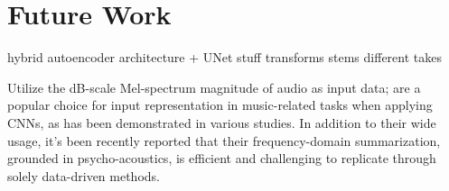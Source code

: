 \chapter{Future Work}

hybrid autoencoder architecture + UNet stuff
transforms
stems
different takes

Utilize the dB-scale Mel-spectrum magnitude of audio as input data; are a popular choice for input representation in music-related tasks when applying CNNs, as has been demonstrated in various studies. In addition to their wide usage, it's been recently reported that their frequency-domain summarization, grounded in psycho-acoustics, is efficient and challenging to replicate through solely data-driven methods. \cite{Kim2020OneStrategies}